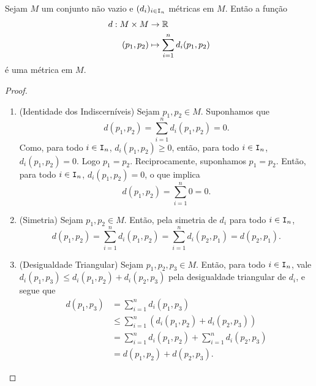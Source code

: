\begin{prop}
	Sejam $M$ um conjunto não vazio e $(d_i)_{i \in \mathtt I_n}$ métricas em $M$. Então a função
	\begin{align*}
	d: M \times M &\to \mathbb{R} \\
	 (p_1,p_2) &\mapsto \sum_{i=1}^n d_i(p_1,p_2)
	\end{align*}
é uma métrica em $M$.
\end{prop}
\begin{proof}
	\begin{enumerate}
	\item (Identidade dos Indiscerníveis) Sejam $p_1,p_2 \in M$. Suponhamos que
	\begin{equation*}
	d(p_1,p_2) = \sum_{i=1}^n d_i(p_1,p_2) = 0.
	\end{equation*}
Como, para todo $i \in \mathtt I_n$, $d_i(p_1,p_2) \geq 0$, então, para todo $i \in \mathtt I_n$, $d_i(p_1,p_2) = 0$. Logo $p_1=p_2$. Reciprocamente, suponhamos $p_1=p_2$. Então, para todo $i \in \mathtt I_n$, $d_i(p_1,p_2)=0$, o que implica
	\begin{equation*}
	d(p_1,p_2) = \sum_{i=1}^n 0 = 0.
	\end{equation*}
	
	\item (Simetria) Sejam $p_1,p_2 \in M$. Então, pela simetria de $d_i$ para todo $i \in \mathtt I_n$,
	\begin{equation*}
	d(p_1,p_2) = \sum_{i=1}^n d_i(p_1,p_2) = \sum_{i=1}^n d_i(p_2,p_1) = d(p_2,p_1).
	\end{equation*}
	
	\item (Desigualdade Triangular) Sejam $p_1,p_2,p_3 \in M$. Então, para todo $i \in \mathtt I_n$, vale $d_i(p_1,p_3) \leq d_i(p_1,p_2)+d_i(p_2,p_3)$ pela desigualdade triangular de $d_i$, e segue que
	\begin{align*}
	d(p_1,p_3) &= \sum_{i=1}^n d_i(p_1,p_3) \\
				&\leq \sum_{i=1}^n (d_i(p_1,p_2)+d_i(p_2,p_3)) \\
				&= \sum_{i=1}^n d_i(p_1,p_2) + \sum_{i=1}^n d_i(p_2,p_3) \\
				&= d(p_1,p_2)+d(p_2,p_3).
	\end{align*}
	\end{enumerate}
\end{proof}

